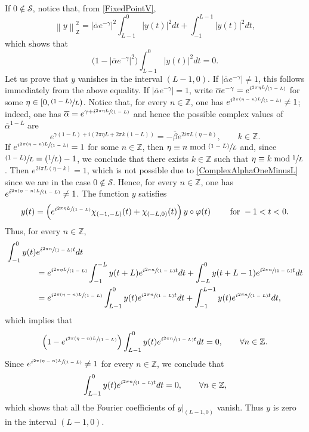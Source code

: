 \documentclass[10pt]{amsart}
\newcommand{\spfrac}[2]{\sfrac{#1}{(#2)}}
\newcommand{\psfrac}[2]{\sfrac{(#1)}{#2}}
\newcommand{\Psfrac}[2]{(\sfrac{#1}{#2})}
\theoremstyle{plain}
\theoremstyle{definition}
\newcommand{\norm}[1]{\left\lVert #1\right\lVert}
\newcommand{\abs}[1]{\left\lvert #1\right \rvert}
\begin{document}
If $0 \notin \mathcal S$, notice that, from \eqref{FixedPointV},
\[
\norm{y}_{\mathsf Z}^2 = \abs{\overline\alpha e^{-\gamma}}^2 \int_{L-1}^{0} \abs{y(t)}^2 dt + \int_{-1}^{L - 1} \abs{y(t)}^2 dt,
\]
which shows that
\[
\bigl(1 - \abs{\overline\alpha e^{-\gamma}}^2\bigr) \int_{L-1}^{0} \abs{y(t)}^2 dt = 0.
\]
Let us prove that $y$ vanishes in the interval $(L - 1, 0)$. If $\abs{\overline\alpha e^{-\gamma}} \neq 1$, this follows immediately from the above equality. If $\abs{\overline\alpha e^{-\gamma}} = 1$, write $\overline\alpha e^{-\gamma} = e^{i \spfrac{2\pi\eta L}{1 - L}}$ for some $\eta \in \left[0, \psfrac{1-L}{L}\right)$. Notice that, for every $n \in \mathbb Z$, one has $e^{i \spfrac{2\pi(\eta - n) L}{1 - L}} \neq 1$; indeed, one has $\overline\alpha = e^{\gamma + i \spfrac{2\pi\eta L}{1 - L}}$ and hence the possible complex values of $\overline\alpha^{1-L}$ are
\begin{equation}
\label{ComplexAlphaOneMinusL}
e^{\gamma (1 - L) + i (2\pi\eta L + 2\pi k (1 - L))} = -\overline\beta e^{2 i \pi L (\eta - k)}, \qquad k \in \mathbb Z.
\end{equation}
If $e^{i \spfrac{2\pi(\eta - n) L}{1 - L}} = 1$ for some $n \in \mathbb Z$, then $\eta \equiv n \bmod \psfrac{1-L}{L}$ and, since $\psfrac{1-L}{L} = \Psfrac{1}{L} - 1$, we conclude that there exists $k \in \mathbb Z$ such that $\eta \equiv k \bmod \sfrac{1}{L}$. Then $e^{2 i \pi L (\eta - k)} = 1$, which is not possible due to \eqref{ComplexAlphaOneMinusL} since we are in the case $0 \notin \mathcal S$. Hence, for every $n \in \mathbb Z$, one has $e^{i \spfrac{2\pi(\eta - n) L}{1 - L}} \neq 1$. The function $y$ satisfies
\[
y(t) = \left(e^{i \spfrac{2\pi\eta L}{1 - L}} \chi_{(-1, -L)}(t) + \chi_{(-L, 0)}(t)\right) y \circ \varphi(t) \qquad \text{ for } -1 < t < 0.
\]
Thus, for every $n \in \mathbb Z$,
\begin{align*}
\int_{-1}^0 y(t) &e^{i \spfrac{2 \pi n}{1-L} t} dt\\[-5pt]
 & = e^{i \spfrac{2\pi\eta L}{1 - L}} \int_{-1}^{-L} y(t + L) e^{i \spfrac{2 \pi n}{1-L} t} dt + \int_{-L}^0 y(t + L - 1) e^{i \spfrac{2 \pi n}{1-L} t} dt \\
& = e^{i \spfrac{2\pi(\eta - n) L}{1 - L}} \int_{L-1}^{0} y(t) e^{i \spfrac{2 \pi n}{1-L} t} dt + \int_{-1}^{L - 1} y(t) e^{i \spfrac{2 \pi n}{1-L} t} dt,
\end{align*}
which implies that
\[
\left(1 - e^{i \spfrac{2\pi(\eta - n) L}{1 - L}}\right) \int_{L-1}^{0} y(t) e^{i \spfrac{2 \pi n}{1-L} t} dt = 0, \qquad \forall n \in \mathbb Z.
\]
Since $e^{i \spfrac{2\pi(\eta - n) L}{1 - L}} \neq 1$ for every $n \in \mathbb Z$, we conclude that
\[
\int_{L-1}^{0} y(t) e^{i \spfrac{2 \pi n}{1-L} t} dt = 0, \qquad \forall n \in \mathbb Z,
\]
which shows that all the Fourier coefficients of $y|_{(L-1, 0)}$ vanish. Thus $y$ is zero in the interval $(L-1, 0)$.
\end{document}
